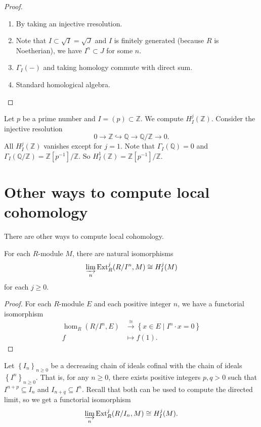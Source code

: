 \begin{proof}
    \begin{enumerate}[(1)]
      \item By taking an injective rresolution.
      \item Note that \(I\subset \sqrt{I}=\sqrt{J}\) and \(I\) is finitely generated (because \(R\) is Noetherian), we have \(I^n\subset J\) for some \(n\). 
      \item \(\Gamma_I(-)\) and taking homology commute with direct sum.
      \item Standard homological algebra.
    \end{enumerate}
\end{proof}

\begin{example}
    Let \(p\) be a prime number and \(I=(p)\subset \mathbb{Z}\). We compute \(H_I^j(\mathbb{Z})\). Consider the injective resolution 
    \[0\rightarrow \mathbb{Z}\hookrightarrow \mathbb{Q}\rightarrow \mathbb{Q}/\mathbb{Z}\rightarrow 0.\]
    All \(H^j_I(\mathbb{Z})\) vanishes except for \(j=1\). Note that \(\Gamma_I(\mathbb{Q})=0\) and \(\Gamma_I(\mathbb{Q}/\mathbb{Z})=\mathbb{Z}[p^{-1}]/\mathbb{Z}\). So \(H^1_I(\mathbb{Z})=\mathbb{Z}[p^{-1}]/\mathbb{Z}\).
\end{example}

\section{Other ways to compute local cohomology}

There are other ways to compute local cohomology.

\begin{theorem}
  For each \(R\)-module \(M\), there are natural isomorphisms
  \[\varinjlim_n \mathrm{Ext}^j_R(R/I^n,M)\cong H^j_I(M)\]
  for each \(j\geq 0\).
\end{theorem}

\begin{proof}
    For each \(R\)-module \(E\) and each positive integer \(n\), we have a functorial isomorphism
    \begin{align*}
         \hom_R(R/I^n,E)&\xrightarrow{\cong} \left\{ x\in E\mid I^n\cdot x=0 \right\}\\
         f&\mapsto f(1).
    \end{align*}
\end{proof}

\begin{remark}
     Let \(\left\{ I_n \right\}_{n\geq 0}\) be a decreasing chain of ideals cofinal with the chain of ideals \(\left\{ I^n \right\}_{n\geq 0}\). That is, for any \(n\geq 0\), there exists positive integers \(p,q>0\) such that \(I^{n+p}\subseteq I_n \) and \(I_{n+q}\subseteq I^n\). Recall that both can be used to compute the directed limit, so we get a functorial isomorphism 
     \[\varinjlim_n \mathrm{Ext}^j_R(R/I_n,M)\cong H^j_I(M).\]
\end{remark}

